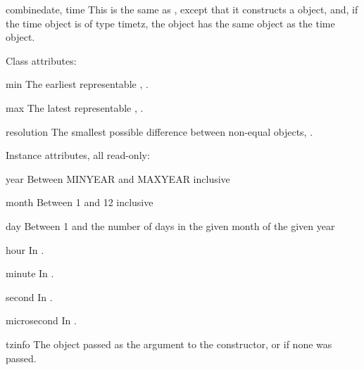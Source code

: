 \begin{funcdesc}{combine}{date, time}
    This is the same as , except that it constructs
    a  object, and, if the time object is of type timetz,
    the  object has the same  object as the time object.
\end{funcdesc}

Class attributes:

\begin{memberdesc}{min}
        The earliest representable ,
        .
\end{memberdesc}

\begin{memberdesc}{max}
        The latest representable ,
        .
\end{memberdesc}

\begin{memberdesc}{resolution}
        The smallest possible difference between non-equal 
        objects, .
\end{memberdesc}

Instance attributes, all read-only:

\begin{memberdesc}{year}
Between MINYEAR and MAXYEAR inclusive
\end{memberdesc}
\begin{memberdesc}{month}
Between 1 and 12 inclusive
\end{memberdesc}
\begin{memberdesc}{day}
Between 1 and the number of days in the given month
                    of the given year
\end{memberdesc}
\begin{memberdesc}{hour}
In .
\end{memberdesc}
\begin{memberdesc}{minute}
In .
\end{memberdesc}
\begin{memberdesc}{second}
In .
\end{memberdesc}
\begin{memberdesc}{microsecond}
In .
\end{memberdesc}
\begin{memberdesc}{tzinfo}
The object passed as the  argument to
                    the  constructor, or 
                    if none was passed.
\end{memberdesc}

